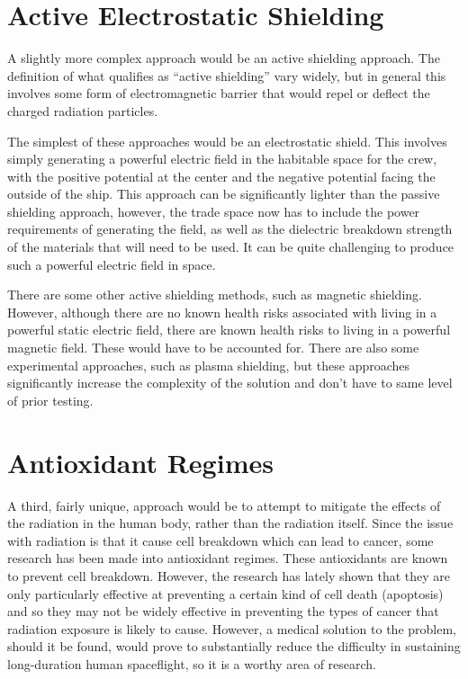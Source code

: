 \documentclass{article}
\begin{document}
  \section{Active Electrostatic Shielding}

  A slightly more complex approach would be an active shielding approach. The
  definition of what qualifies as ``active shielding'' vary widely, but in
  general this involves some form of electromagnetic barrier that would repel or
  deflect the charged radiation particles.

  The simplest of these approaches would be an electrostatic shield. This
  involves simply generating a powerful electric field in the habitable space
  for the crew, with the positive potential at the center and the negative
  potential facing the outside of the ship. This approach can be significantly
  lighter than the passive shielding approach, however, the trade space now has
  to include the power requirements of generating the field, as well as the
  dielectric breakdown strength of the materials that will need to be used. It
  can be quite challenging to produce such a powerful electric field in space.

  There are some other active shielding methods, such as magnetic shielding.
  However, although there are no known health risks associated with living in a
  powerful static electric field, there are known health risks to living in a
  powerful magnetic field. These would have to be accounted for. There are also
  some experimental approaches, such as plasma shielding, but these approaches
  significantly increase the complexity of the solution and don't have to same
  level of prior testing.

  \section{Antioxidant Regimes}

  A third, fairly unique, approach would be to attempt to mitigate the effects
  of the radiation in the human body, rather than the radiation itself. Since
  the issue with radiation is that it cause cell breakdown which can lead to
  cancer, some research has been made into antioxidant regimes. These
  antioxidants are known to prevent cell breakdown. However, the research has
  lately shown that they are only particularly effective at preventing a certain
  kind of cell death (apoptosis) and so they may not be widely effective in
  preventing the types of cancer that radiation exposure is likely to cause.
  However, a medical solution to the problem, should it be found, would prove to
  substantially reduce the difficulty in sustaining long-duration human
  spaceflight, so it is a worthy area of research.
\end{document}
